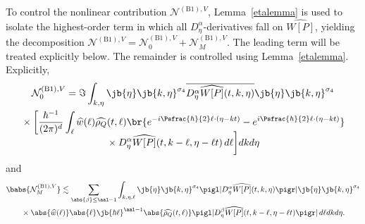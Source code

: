 To control the nonlinear contribution \(\mathcal{N}^{\mathrm{(B1)},V}\), Lemma~\ref{etalemma} is used to isolate the highest-order term in which all \(D_\eta^\alpha\)-derivatives fall on \(\widehat{W[P]}\), yielding the decomposition $\mathcal{N}^{\mathrm{(B1)},V}= \mathcal{N}_0^{\mathrm{(B1)},V}+\mathcal{N}_M^{\mathrm{(B1)},V}.$ The leading term will be treated explicitly below. The remainder is controlled using Lemma~\ref{etalemma}. Explicitly,
\begin{multline*}
\mathcal{N}^{\mathrm{(B1)},V}_0=\Im\int_{k,\eta}\jb{\eta}\jb{k,\eta}^{\sigma_4}\overline{D_\eta^\alpha \widehat{W[P]}(t,k,\eta)}\jb{\eta}\jb{k,\eta}^{\sigma_4}\\
{}\times\biggl[\frac{\hbar^{-1}}{(2\pi)^d}\int_\ell\widehat{w}(\ell)\widehat{\rho_Q}(t,\ell )\br{e^{-i\Psfrac{\hbar}{2}\ell \cdot(\eta-kt)}-e^{i\Psfrac{\hbar}{2}\ell \cdot(\eta-kt)}}\\[-7pt]
{}\times D_\eta^\alpha\widehat{W[P]}(t,k-\ell ,\eta-\ell t)\,d\ell\biggr] dkd\eta
\end{multline*}
and
\begin{multline*}
\babs{\mathcal{N}_M^{\mathrm{(B1)},V}}\lesssim\sum_{\abs{\beta}\leq \aal-1}\int_{k,\eta,\ell }\jb{\eta}\jb{k,\eta}^{\sigma_4}\pigl|{D_\eta^\alpha \widehat{W[P]}(t,k,\eta)}\pigr|\jb{\eta}\jb{k,\eta}^{\sigma_4}\\
{}\times\abs{\widehat{w}(\ell )}\abs{\ell }\jb{\hbar\ell }^{\aal-1}\abs{\widehat{\rho_Q}(t,\ell )}\pigl|{D_\eta^\beta\widehat{W[P]}(t,k-\ell ,\eta-\ell t)}\pigr|\,d\ell dkd\eta.
\end{multline*}

